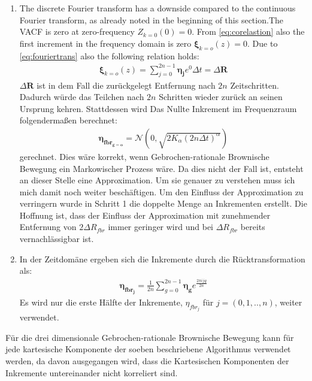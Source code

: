 \documentclass[
  a4paper,BCOR10mm,oneside,
  bibtotoc,idxtotoc,
  headsepline,footsepline,%
  fleqn,openbib
]{scrbook}
\begin{document}
\begin{enumerate}
 \item The discrete Fourier transform has a downside compared to the continuous Fourier transform, as already noted in the beginning of this section.The VACF is zero at zero-frequency $Z_{k=0}(0)=0$.  From \cref{eq:corelastion} also the first increment in the frequency domain is zero $\bm{\xi}_{k=o}(z)= 0$. Due to \cref{eq:fouriertrans} also the following relation holds:
 \begin{align}
  \bm{\xi}_{k=o}(z) = \sum_{j=0}^{2n-1} \boldsymbol{\eta_j} e^{0} \Delta t =\Delta  \bm{R}
 \end{align}
$\Delta \boldsymbol{R} $ ist in dem Fall die zurückgelegt Entfernung nach $2n$ Zeitschritten.
Dadurch würde das Teilchen nach $2n$ Schritten wieder zurück an seinen Ursprung kehren. Stattdessen wird Das Nullte Inkrement im Frequenzraum folgendermaßen berechnet:
\begin{align}
\boldsymbol{\eta_{fbr_{g=o}}} = \mathcal{N}(0,\sqrt{2 K_{\alpha} (2n \Delta t)^\alpha})
\end{align}
 gerechnet. Dies wäre korrekt, wenn Gebrochen-rationale Brownische Bewegung ein Markowischer Prozess wäre. Da dies nicht der Fall ist, entsteht an dieser Stelle eine Approximation. Um sie genauer zu verstehen muss ich mich damit noch weiter beschäftigen. Um den Einfluss der Approximation zu verringern wurde in Schritt 1 die doppelte Menge an Inkrementen erstellt. Die Hoffnung ist, dass der Einfluss der Approximation  mit zunehmender Entfernung von $2 \Delta R_{fbr}$ immer geringer wird und bei $\Delta R_{fbr}$ bereits vernachlässigbar ist.
 \item In der Zeitdomäne ergeben sich die Inkremente durch die Rücktransformation als:
 \begin{align}
 \boldsymbol{\eta_{fbr_j}}= \frac{1}{2n} \sum_{g=0}^{2n-1} \boldsymbol{\eta_g} e^{\frac{2 \pi i j g }{2n}}
 \end{align}
Es wird nur die erste Hälfte der Inkremente, $\eta_{fbr_j}$ für $j=(0,1,..,n)$, weiter verwendet.
\end{enumerate}
Für die drei dimensionale Gebrochen-rationale Brownische Bewegung kann für jede kartesische Komponente der soeben beschriebene Algorithmus verwendet werden, da davon ausgegangen wird, dass die Kartesischen Komponenten der Inkremente untereinander nicht korreliert sind. 
\end{document}
